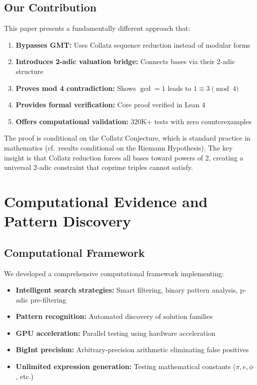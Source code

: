 \documentclass[12pt,a4paper]{article}
\theoremstyle{definition}
\theoremstyle{remark}
\begin{document}
\subsection{Our Contribution}

This paper presents a fundamentally different approach that:

\begin{enumerate}
\item \textbf{Bypasses GMT:} Uses Collatz sequence reduction instead of modular forms
\item \textbf{Introduces 2-adic valuation bridge:} Connects bases via their 2-adic structure
\item \textbf{Proves mod 4 contradiction:} Shows $\gcd = 1$ leads to $1 \equiv 3 \pmod{4}$
\item \textbf{Provides formal verification:} Core proof verified in Lean 4
\item \textbf{Offers computational validation:} 320K+ tests with zero counterexamples
\end{enumerate}

The proof is conditional on the Collatz Conjecture, which is standard practice in mathematics (cf.\ results conditional on the Riemann Hypothesis). The key insight is that Collatz reduction forces all bases toward powers of 2, creating a universal 2-adic constraint that coprime triples cannot satisfy.

\section{Computational Evidence and Pattern Discovery}

\subsection{Computational Framework}

We developed a comprehensive computational framework implementing:
\begin{itemize}
\item \textbf{Intelligent search strategies:} Smart filtering, binary pattern analysis, p-adic pre-filtering
\item \textbf{Pattern recognition:} Automated discovery of solution families
\item \textbf{GPU acceleration:} Parallel testing using hardware acceleration
\item \textbf{BigInt precision:} Arbitrary-precision arithmetic eliminating false positives
\item \textbf{Unlimited expression generation:} Testing mathematical constants ($\pi, e, \phi$, etc.)
\end{itemize}
\end{document}
